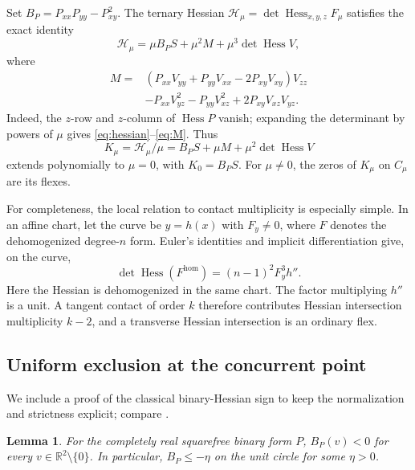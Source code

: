 \documentclass[11pt,a4paper]{article}
\newtheorem{lemma}[theorem]{Lemma}
\theoremstyle{remark}
\newcommand{\R}{\mathbb R}
\newcommand{\Hess}{\operatorname{Hess}}
\begin{document}
Set \(B_P=P_{xx}P_{yy}-P_{xy}^2\). The ternary Hessian
\(\mathcal H_\mu=\det\Hess_{x,y,z}F_\mu\) satisfies the exact identity
\begin{equation}\label{eq:hessian}
 \mathcal H_\mu
   =\mu B_PS+\mu^2M+\mu^3\det\Hess V,
\end{equation}
where
\begin{equation}\label{eq:M}
\begin{split}
 M={}&(P_{xx}V_{yy}+P_{yy}V_{xx}-2P_{xy}V_{xy})V_{zz}\\
     &-P_{xx}V_{yz}^2-P_{yy}V_{xz}^2+2P_{xy}V_{xz}V_{yz}.
\end{split}
\end{equation}
Indeed, the \(z\)-row and \(z\)-column of \(\Hess P\) vanish;
expanding the determinant by powers of \(\mu\) gives
\eqref{eq:hessian}--\eqref{eq:M}. Thus
\begin{equation}\label{eq:normalized}
 K_\mu=\mathcal H_\mu/\mu
       =B_PS+\mu M+\mu^2\det\Hess V
\end{equation}
extends polynomially to \(\mu=0\), with \(K_0=B_PS\).
For \(\mu\ne0\), the zeros of \(K_\mu\) on \(C_\mu\) are its flexes.

For completeness, the local relation to contact multiplicity is
especially simple. In an affine chart, let the curve be \(y=h(x)\)
with \(F_y\ne0\), where \(F\) denotes the dehomogenized degree-\(n\)
form. Euler's identities and implicit differentiation give, on the curve,
\begin{equation}\label{eq:contact}
 \det\Hess(F^{\mathrm{hom}})
        =(n-1)^2F_y^3h''.
\end{equation}
Here the Hessian is dehomogenized in the same chart.
The factor multiplying \(h''\) is a unit. A tangent contact of order
\(k\) therefore contributes Hessian intersection multiplicity
\(k-2\), and a transverse Hessian intersection is an ordinary flex.

\subsection{Uniform exclusion at the concurrent point}

We include a proof of the classical binary-Hessian sign to keep the
normalization and strictness explicit; compare
\citep[Proposition~1 and proof of Theorem~1]{causare}.

\begin{lemma}\label{lem:binary}
For the completely real squarefree binary form \(P\),
\(B_P(v)<0\) for every \(v\in\R^2\setminus\{0\}\).
In particular, \(B_P\leq-\eta\) on the unit circle for some \(\eta>0\).
\end{lemma}
\end{document}
